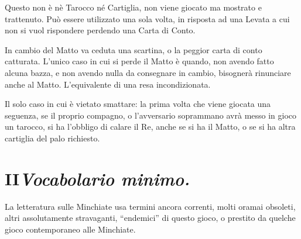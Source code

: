 \documentclass[11pt,a6paper]{article}
\begin{document}
Questo non è nè Tarocco né Cartiglia, non viene giocato ma mostrato e
trattenuto. Può essere utilizzato una sola volta, in risposta ad una Levata
a cui non si vuol rispondere perdendo una Carta di Conto.

In cambio del Matto va ceduta una scartina, o la peggior carta di conto
catturata. L'unico caso in cui si perde il Matto è quando, non avendo fatto
alcuna bazza, e non avendo nulla da consegnare in cambio, bisognerà
rinunciare anche al Matto.  L'equivalente di una resa incondizionata.

Il solo caso in cui è vietato smattare: la prima volta che viene giocata una
seguenza, se il proprio compagno, o l'avversario soprammano avrà messo in
gioco un tarocco, si ha l'obbligo di calare il Re, anche se si ha il Matto,
o se si ha altra cartiglia del palo richiesto.

\section{II\hfill{\large\mdseries\slshape Vocabolario minimo.}}

La letteratura sulle Minchiate usa termini ancora correnti, molti oramai
obsoleti, altri assolutamente stravaganti, ``endemici'' di questo gioco, o
prestito da quelche gioco contemporaneo alle Minchiate.
\end{document}

